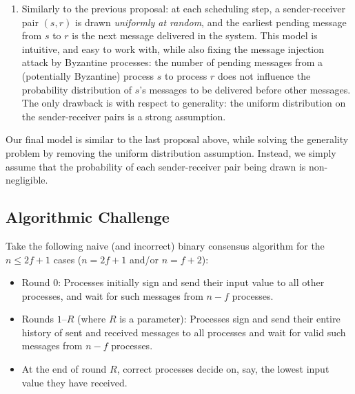 \begin{enumerate}
    \item Similarly to the previous proposal: at each scheduling step, a sender-receiver pair $(s,r)$ is drawn \textit{uniformly at random}, and the earliest pending message from $s$ to $r$ is the next message delivered in the system. This model is intuitive, and easy to work with, while also fixing the message injection attack by Byzantine processes: the number of pending messages from a (potentially Byzantine) process $s$ to process $r$ does not influence the probability distribution of $s$'s messages to be delivered before other messages. The only drawback is with respect to generality: the uniform distribution on the sender-receiver pairs is a strong assumption.
\end{enumerate}

Our final model is similar to the last proposal above, while solving the generality problem by removing the uniform distribution assumption. Instead, we simply assume that the probability of each sender-receiver pair being drawn is non-negligible.

\subsection{Algorithmic Challenge}\label{sec:algo-challenge}
Take the following naive (and incorrect) binary consensus algorithm for the $n\leq2f+1$ cases ($n=2f+1$ and/or $n=f+2$):
\begin{itemize}
    \item Round $0$: Processes initially sign and send their input value to all other processes, and wait for such messages from $n-f$ processes.
    \item Rounds $1$--$R$ (where $R$ is a parameter): Processes sign and send their entire history of sent and received messages to all processes and wait for valid such messages from $n-f$ processes.
    \item At the end of round $R$, correct processes decide on, say, the lowest input value they have received.
\end{itemize}


